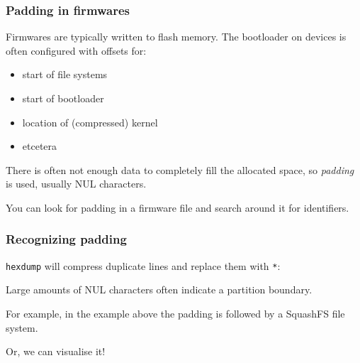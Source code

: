 \documentclass[11pt]{beamer}
\begin{document}
\begin{frame}[fragile]
\frametitle{Padding in firmwares}
Firmwares are typically written to flash memory. The bootloader on devices is often configured with offsets for:

\begin{itemize}
\item start of file systems
\item start of bootloader
\item location of (compressed) kernel
\item etcetera
\end{itemize}

There is often not enough data to completely fill the allocated space, so \textit{padding} is used, usually NUL characters.
{\scriptsize\color{blue}{
\begin{verbatim}
0007b130  00 00 00 00 00 00 00 00  00 00 00 00 00 00 00 00  |................|
\end{verbatim}
}}

You can look for padding in a firmware file and search around it for identifiers.
\end{frame}

\begin{frame}[fragile]
\frametitle{Recognizing padding}
\texttt{hexdump} will compress duplicate lines and replace them with \texttt{*}:

{\scriptsize\color{blue}{
\begin{verbatim}
0007b130  00 00 00 00 00 00 00 00  00 00 00 00 00 00 00 00  |................|
*
0007b400  68 73 71 73 06 02 00 00  e0 05 62 0f 3f 00 00 00  |hsqs......b.?...|
\end{verbatim}
}}

Large amounts of NUL characters often indicate a partition boundary.

For example, in the example above the padding is followed by a SquashFS file system.

Or, we can visualise it!
\end{frame}

\end{document}

